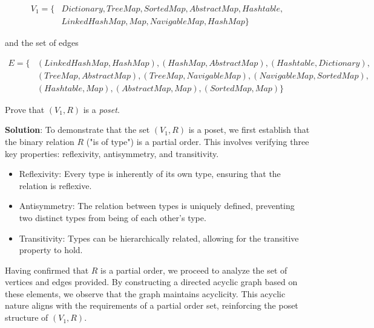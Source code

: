 \documentclass[12pt]{article}
\begin{document}
\begin{spacing}{1.5}
\begin{enumerate}
		      \begin{align*}
		      	V_1= \{ & Dictionary, TreeMap, SortedMap, AbstractMap, Hashtable, \\
		      	        & LinkedHashMap, Map, NavigableMap, HashMap\}             
		      \end{align*}
		      		      		              
		      and the set of edges
		      		      		      
		      \begin{align*}
		      	E = \{ & (LinkedHashMap, HashMap), (HashMap, AbstractMap), (Hashtable, Dictionary),  \\
		      	       & (TreeMap, AbstractMap), (TreeMap, NavigableMap), (NavigableMap, SortedMap), \\
		      	       & (Hashtable, Map), (AbstractMap, Map), (SortedMap, Map) \}                   
		      \end{align*}
		      		      		      
		      Prove that $(V_1, R)$ is a \textit{poset}.
		      		      		      
		      \textbf{Solution}:  To demonstrate that the set $(V_1, R)$ is a poset, we first establish that the binary relation $R$ ("is of type") is a partial order. This involves verifying three key properties: reflexivity, antisymmetry, and transitivity.
		      		      
		      \begin{itemize}
		      	\item Reflexivity: Every type is inherently of its own type, ensuring that the relation is reflexive.
		      	      		      	              
		      	\item Antisymmetry: The relation between types is uniquely defined, preventing two distinct types from being of each other's type.
		      	      		      	              
		      	\item Transitivity: Types can be hierarchically related, allowing for the transitive property to hold.
		      	      		      	              
		      \end{itemize} 
		      		      
		      Having confirmed that $R$ is a partial order, we proceed to analyze the set of vertices and edges provided. By constructing a directed acyclic graph based on these elements, we observe that the graph maintains acyclicity. This acyclic nature aligns with the requirements of a partial order set, reinforcing the poset structure of $(V_1, R)$. 
		      		                  

\end{enumerate}
\end{spacing}
\end{document}
